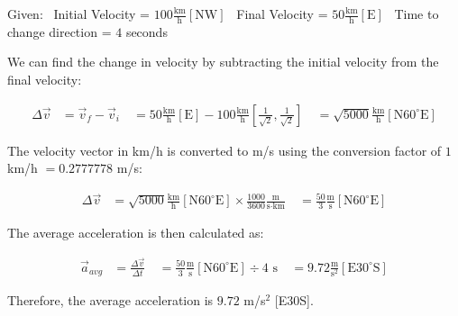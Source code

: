 \documentclass{article}
\begin{document}
Given: \
Initial Velocity = $100 \frac{\text{km}}{\text{h}} [\text{NW}]$ \
Final Velocity = $50 \frac{\text{km}}{\text{h}} [\text{E}]$ \
Time to change direction = $4$ seconds \

We can find the change in velocity by subtracting the initial velocity from the final velocity:

\begin{align*}
\Delta \vec{v} &= \vec{v}_f - \vec{v}_i \
&= 50 \frac{\text{km}}{\text{h}} [\text{E}] - 100 \frac{\text{km}}{\text{h}} \left[\frac{1}{\sqrt{2}},\frac{1}{\sqrt{2}}\right] \
&= \sqrt{5000} \frac{\text{km}}{\text{h}} [\text{N}60^\circ\text{E}]
\end{align*}

The velocity vector in km/h is converted to m/s using the conversion factor of $1$ km/h $= 0.2777778$ m/s:

\begin{align*}
\Delta \vec{v} &= \sqrt{5000} \frac{\text{km}}{\text{h}} [\text{N}60^\circ\text{E}] \times \frac{1000}{3600} \frac{\text{m}}{\text{s}\cdot \text{km}} \
&= \frac{50}{3} \frac{\text{m}}{\text{s}} [\text{N}60^\circ\text{E}]
\end{align*}

The average acceleration is then calculated as:

\begin{align*}
\vec{a}_{avg} &= \frac{\Delta \vec{v}}{\Delta t} \
&= \frac{50}{3} \frac{\text{m}}{\text{s}} [\text{N}60^\circ\text{E}] \div 4 \text{ s} \
&= 9.72 \frac{\text{m}}{\text{s}^2} [\text{E}30^\circ\text{S}]
\end{align*}

Therefore, the average acceleration is $9.72$ m/s$^2$ [E30S].

\end{document}
